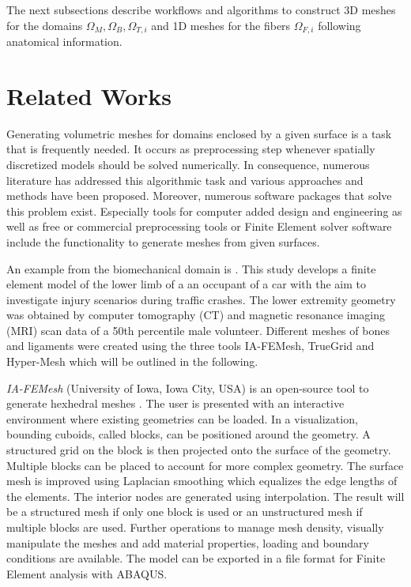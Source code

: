 The next subsections describe workflows and algorithms to construct 3D meshes for the domains $\Omega_M,\Omega_B,\Omega_{T,i}$ and 1D meshes for the fibers $\Omega_{F,i}$ following anatomical information.

\section{Related Works}

Generating volumetric meshes for domains enclosed by a given surface is a task that is frequently needed. It occurs as preprocessing step whenever spatially discretized models should be solved numerically. In consequence, numerous literature has addressed this algorithmic task and various approaches and methods have been proposed. Moreover, numerous software packages that solve this problem exist. Especially tools for computer added design and engineering as well as free or commercial preprocessing tools or Finite Element solver software include the functionality to generate meshes from given surfaces.

An example from the biomechanical domain is \cite{untaroiu2013finite}. This study develops a finite element model of the lower limb of a an occupant of a car with the aim to investigate injury scenarios during traffic crashes.
The lower extremity geometry was obtained by computer tomography (CT) and magnetic resonance imaging (MRI) scan data of a 50th percentile male volunteer. Different meshes of bones and ligaments were created using the three tools IA-FEMesh, TrueGrid and Hyper-Mesh which will be outlined in the following.

\emph{IA-FEMesh} (University of Iowa, Iowa City, USA) is an open-source tool to generate hexhedral meshes \cite{grosland2009ia}. The user is presented with an interactive environment where existing geometries can be loaded. In a visualization, bounding cuboids, called blocks, can be positioned around the geometry. A structured grid on the block is then projected onto the surface of the geometry. Multiple blocks can be placed to account for more complex geometry. The surface mesh is improved using Laplacian smoothing which equalizes the edge lengths of the elements.
The interior nodes are generated using interpolation.
The result will be a structured mesh if only one block is used or an unstructured mesh if multiple blocks are used. Further operations to manage mesh density, visually manipulate the meshes and add material properties, loading and boundary conditions are available. The model can be exported in a file format for Finite Element analysis with ABAQUS.

